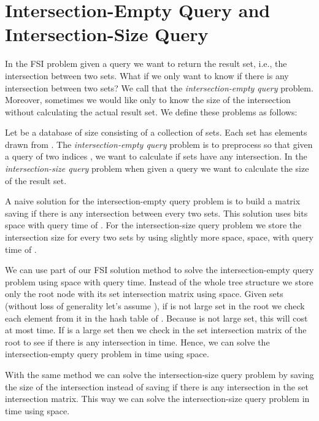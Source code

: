 \documentclass[10pt]{llncs}
\begin{document}
\section{Intersection-Empty Query and Intersection-Size Query}\label{sec:Intersection-Empty Query and Intersection-Size Query}
In the FSI problem given a query we want to return
the result set, i.e., the intersection between two sets.
What if we only want to know if there is any intersection between two sets?
We call that the \emph{intersection-empty query} problem.
Moreover, sometimes we would like only to know the size of the intersection
without calculating the actual result set.
We define these problems as follows:
\begin{definition}
Let  be a database of size  consisting of a collection of  sets.
Each set has elements drawn from .
The \emph{intersection-empty query} problem is to preprocess  so that given a query of two indices ,
we want to calculate if sets  have any intersection.
In the \emph{intersection-size query} problem when given a query we want to calculate the size of the result set.
\end{definition}



A naive solution for the intersection-empty query problem
is to build a matrix saving if there is any intersection between every two sets.
This solution uses  bits space with query time of .
For the intersection-size query problem we store the intersection size for every two sets
by using slightly more space,  space, with query time of .

We can use part of our FSI solution method to solve the intersection-empty query problem
using  space with  query time.
Instead of the whole tree structure we store only the root node with its set intersection matrix using  space.
Given sets  (without loss of generality let's assume ),
if  is not large set in the root we check each element from it in the hash table of .
Because  is not large set, this will cost at most  time.
If  is a large set then we check in the set intersection matrix of the root
to see if there is any intersection in  time.
Hence, we can solve the intersection-empty query problem in  time using  space.

With the same method we can solve the intersection-size query problem
by saving the size of the intersection instead of saving if there is any intersection in the set intersection matrix.
This way we can solve the intersection-size query problem in  time using  space.
\end{document}

